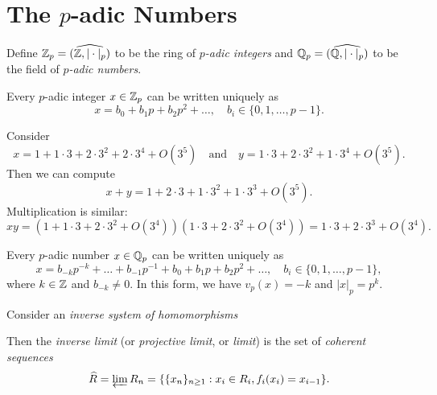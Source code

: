 \section{The \texorpdfstring{$p$}{p}-adic Numbers}

\begin{definition}
  Define $\mathbb{Z}_p = \widehat{(\mathbb{Z}, |\cdot|_p)}$ to be
  the ring of \emph{$p$-adic integers} and
  $\mathbb{Q}_p = \widehat{(\mathbb{Q}, |\cdot|_p)}$ to be the
  field of \emph{$p$-adic numbers}.
\end{definition}

\begin{theorem}
  Every $p$-adic integer $x \in \mathbb{Z}_p$ can be written
  uniquely as
  \[
    x = b_0 + b_1 p + b_2 p^2 + \dots, \quad
    b_i \in \{0, 1, \dots, p - 1\}.
  \]
\end{theorem}

\begin{example}
  Consider
  \[
    x = 1 + 1 \cdot 3 + 2 \cdot 3^2 + 2 \cdot 3^4 + O(3^5) \quad \text{and} \quad
    y = 1 \cdot 3 + 2 \cdot 3^2 + 1 \cdot 3^4 + O(3^5).
  \]
  Then we can compute
  \[
    x + y = 1 + 2 \cdot 3 + 1 \cdot 3^2 + 1 \cdot 3^3
    + O(3^5).
  \]
  Multiplication is similar:
  \[
    xy = (1 + 1 \cdot 3 + 2 \cdot 3^2 + O(3^4))(1 \cdot 3 + 2 \cdot 3^2 + O(3^4))
    = 1 \cdot 3 + 2 \cdot 3^3 + O(3^4).
  \]
\end{example}

\begin{theorem}
  Every $p$-adic number $x \in \mathbb{Q}_p$ can be written
  uniquely as
  \[
    x = b_{-k} p^{-k} + \dots + b_{-1} p^{-1}
    + b_0 + b_1 p + b_2 p^2 + \dots,
    \quad b_i \in \{0, 1, \dots, p - 1\},
  \]
  where $k \in \mathbb{Z}$ and $b_{-k} \ne 0$. In this form,
  we have $v_p(x) = -k$ and $|x|_p = p^k$.
\end{theorem}

\begin{definition}
  Consider an \emph{inverse system of homomorphisms}
  \begin{center}
  \end{center}
  Then the \emph{inverse limit} (or \emph{projective limit}, or \emph{limit}) is the set of
  \emph{coherent sequences}
  \[\widehat{R} = \varprojlim R_n
  = \{\{x_n\}_{n \ge 1} : x_i \in R_i, f_i(x_i) = x_{i - 1}\}.\]
\end{definition}

